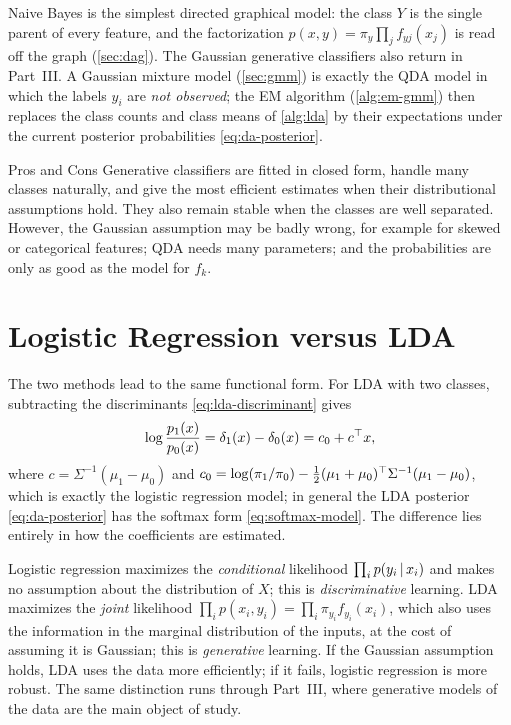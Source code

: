 \begin{remark}
Naive Bayes is the simplest directed graphical model: the class $Y$ is the single parent of every feature, and the factorization $p(x,y)=\pi_y\prod_jf_{yj}(x_j)$ is read off the graph (\cref{sec:dag}). The Gaussian generative classifiers also return in Part~III. A Gaussian mixture model (\cref{sec:gmm}) is exactly the QDA model in which the labels $y_i$ are \emph{not observed}; the EM algorithm (\cref{alg:em-gmm}) then replaces the class counts and class means of \cref{alg:lda} by their expectations under the current posterior probabilities \eqref{eq:da-posterior}.
\end{remark}

\begin{notebox}{Pros and Cons}
Generative classifiers are fitted in closed form, handle many classes naturally, and give the most efficient estimates when their distributional assumptions hold. They also remain stable when the classes are well separated. However, the Gaussian assumption may be badly wrong, for example for skewed or categorical features; QDA needs many parameters; and the probabilities are only as good as the model for $f_k$.
\end{notebox}

\section{Logistic Regression versus LDA}\label{sec:lr-vs-lda}

The two methods lead to the same functional form. For LDA with two classes, subtracting the discriminants \eqref{eq:lda-discriminant} gives
\[
\log\frac{p_1(x)}{p_0(x)}=\delta_1(x)-\delta_0(x)=c_0+c^{\top} x,
\]
where $c=\Sigma^{-1}(\mu_1-\mu_0)$ and $c_0=\log(\pi_1/\pi_0)-\frac12(\mu_1+\mu_0)^{\top}\Sigma^{-1}(\mu_1-\mu_0)$,
which is exactly the logistic regression model; in general the LDA posterior \eqref{eq:da-posterior} has the softmax form \eqref{eq:softmax-model}. The difference lies entirely in how the coefficients are estimated.

\begin{remark}\label{rem:disc-vs-gen}
Logistic regression maximizes the \emph{conditional} likelihood $\prod_ip(y_i\,|\, x_i)$ and makes no assumption about the distribution of $X$; this is \emph{discriminative} learning. LDA maximizes the \emph{joint} likelihood $\prod_ip(x_i,y_i)=\prod_i\pi_{y_i}f_{y_i}(x_i)$, which also uses the information in the marginal distribution of the inputs, at the cost of assuming it is Gaussian; this is \emph{generative} learning. If the Gaussian assumption holds, LDA uses the data more efficiently; if it fails, logistic regression is more robust. The same distinction runs through Part~III, where generative models of the data are the main object of study.
\end{remark}

